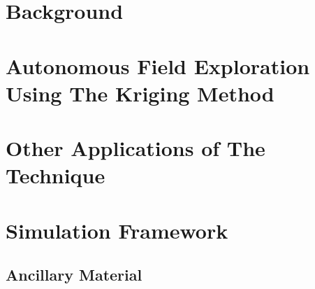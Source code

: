 \documentclass[11pt]{ucthesis}
\begin{document}



\begin{frontmatter}

\maketitle
\copyrightpage

\tableofcontents
\listoffigures
\listoftables





\end{frontmatter}



\part{Background}



\part{Autonomous Field Exploration Using The Kriging Method}






\part{Other Applications of The Technique}

\part{Simulation Framework}




%

\nocite{*}



\appendix
\chapter{Ancillary Material}
\end{document}
